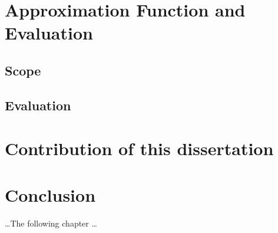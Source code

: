 
\section{Approximation Function and Evaluation}
\label{sec:approach_approximation_function_and_evaluation}

\subsection{Scope}
\label{sub:approach_scope}

\subsection{Evaluation}
\label{sub:approach_evaluation}



\section{Contribution of this dissertation}
\label{sec:approach_contribution_of_this_dissertation}


\section{Conclusion}
\label{sec:approach_conclusion}
\ldots The following chapter \ldots
